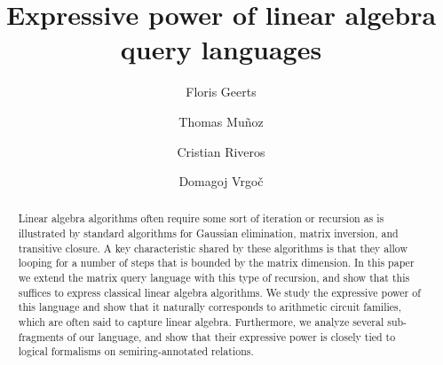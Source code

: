 \documentclass[sigconf]{acmart}
\begin{document}
\title{Expressive power of linear algebra query languages}
\author{Floris Geerts}


\author{Thomas Mu\~{n}oz}

\author{Cristian Riveros}

\author{Domagoj Vrgo\v{c}}


\begin{abstract}
Linear algebra algorithms often require some sort of iteration or recursion as is illustrated by standard algorithms for Gaussian elimination, matrix inversion, and transitive closure. A key characteristic shared by these 
algorithms is that they allow looping for a number of steps that is bounded by the matrix dimension. 
In this paper we extend the matrix query language \lang with this type of recursion, and show that this suffices to express  classical linear algebra algorithms. We study the expressive power of this language and show that it naturally corresponds to arithmetic circuit families, which are often said to capture linear algebra. Furthermore, we analyze several sub-fragments of our language, and show that their expressive power is closely tied to logical formalisms on semiring-annotated relations.
\end{abstract}
\end{document}
